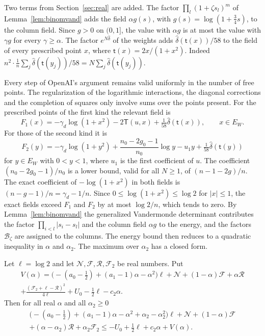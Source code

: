 Two terms from Section~\ref{sec:real} are added. The factor $\prod_l(1+\zeta s_l)^m$ of Lemma~\ref{lem:binomvand}
adds the field $\alpha g(s)$, with $g(s)=\log(1+\frac34s)$, to the column field. Since $g>0$ on $(0,1]$, the
value with $\alpha g$ is at most the value with $\gamma g$ for every $\gamma\ge\alpha$. The factor
$e^{N\hat\delta}$ of the weights adds $\hat\delta(\mathsf t(x))/58$ to the field of every prescribed point $x$,
where $\mathsf t(x)=2x/(1+x^2)$. Indeed $n^2\cdot\frac1n\sum_j\hat\delta(\mathsf t(y_j))/58=N\sum_j\hat\delta(\mathsf t(y_j))$.

Every step of OpenAI's argument remains valid uniformly in the number of free points. The regularization of
the logarithmic interactions, the diagonal corrections and the completion of squares only involve sums over
the points present. For the prescribed points of the first kind the relevant field is
\[
 F_1(x)=-\gamma_d\log(1+x^2)-2\mathsf T(u,x)+\tfrac1{58}\hat\delta(\mathsf t(x)),\qquad x\in E_W .
\]
For those of the second kind it is
\[
 F_2(y)=-\gamma_d\log(1+y^2)+\frac{n_0-2g_0-1}{n_0}\log y-u_1y+\tfrac1{58}\hat\delta(\mathsf t(y))
\]
for $y\in E_W$ with $0<y<1$, where $u_1$ is the first coefficient of $u$. The coefficient $(n_0-2g_0-1)/n_0$ is a lower bound, valid for all
$N\ge1$, of $(n-1-2g)/n$. The exact coefficient of $-\log(1+x^2)$ in both fields is $(n-g-1)/n=\gamma_d-1/n$. Since
$0\le\log(1+x^2)\le\log2$ for $|x|\le1$, the exact fields exceed $F_1$ and $F_2$ by at most $\log2/n$, which tends to zero. By Lemma~\ref{lem:binomvand} the generalized Vandermonde determinant contributes
the factor $\prod_{i<l}|s_i-s_l|$ and the column field $\alpha g$ to the energy, and the factors $\mathcal B_\zeta$
are assigned to the columns. The energy bound then reduces to a quadratic inequality in $\alpha$ and $\alpha_2$.
The maximum over $\alpha_2$ has a closed form.

\begin{lemma}\label{lem:energy-ineq}
Let $\ell=\log2$ and let $\mathcal N,\mathcal F,\mathcal R,\mathcal F_2$ be real numbers. Put
\begin{multline*}
 V(\alpha)=\bigl(-(a_0-\tfrac12)+(a_1-1)\alpha-\alpha^2\bigr)\ell+\mathcal N+(1-\alpha)\mathcal F+\alpha\mathcal R\\
 +\frac{(\mathcal F_2+\ell-\mathcal R)^2}{4\ell}+U_0-\tfrac12\ell-c_2\alpha .
\end{multline*}
Then for all real $\alpha$ and all $\alpha_2\ge0$
\begin{multline*}
 \bigl(-(a_0-\tfrac12)+(a_1-1)\alpha-\alpha^2+\alpha_2-\alpha_2^2\bigr)\ell+\mathcal N+(1-\alpha)\mathcal F\\
 +(\alpha-\alpha_2)\mathcal R+\alpha_2\mathcal F_2\le-U_0+\tfrac12\ell+c_2\alpha+V(\alpha) .
\end{multline*}
\end{lemma}

